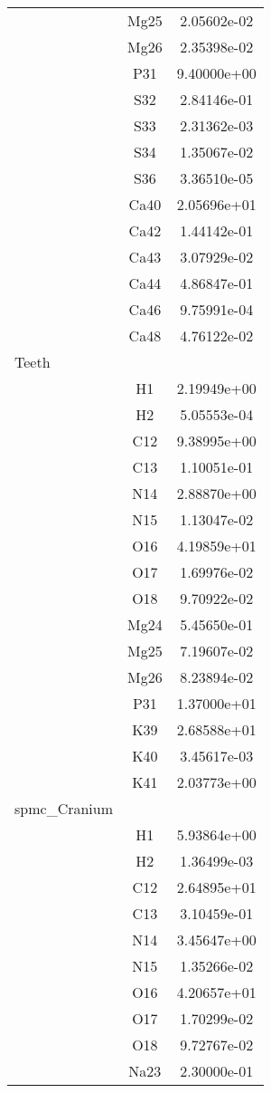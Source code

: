 \begin{centering}
\begin{longtable}{l c c}
& Mg25 & 2.05602e-02 \\ 
& Mg26 & 2.35398e-02 \\ 
& P31 & 9.40000e+00 \\ 
& S32 & 2.84146e-01 \\ 
& S33 & 2.31362e-03 \\ 
& S34 & 1.35067e-02 \\ 
& S36 & 3.36510e-05 \\ 
& Ca40 & 2.05696e+01 \\ 
& Ca42 & 1.44142e-01 \\ 
& Ca43 & 3.07929e-02 \\ 
& Ca44 & 4.86847e-01 \\ 
& Ca46 & 9.75991e-04 \\ 
& Ca48 & 4.76122e-02 \\ 
\hline
Teeth & & \\
\hline
& H1 & 2.19949e+00 \\ 
& H2 & 5.05553e-04 \\ 
& C12 & 9.38995e+00 \\ 
& C13 & 1.10051e-01 \\ 
& N14 & 2.88870e+00 \\ 
& N15 & 1.13047e-02 \\ 
& O16 & 4.19859e+01 \\ 
& O17 & 1.69976e-02 \\ 
& O18 & 9.70922e-02 \\ 
& Mg24 & 5.45650e-01 \\ 
& Mg25 & 7.19607e-02 \\ 
& Mg26 & 8.23894e-02 \\ 
& P31 & 1.37000e+01 \\ 
& K39 & 2.68588e+01 \\ 
& K40 & 3.45617e-03 \\ 
& K41 & 2.03773e+00 \\ 
\hline
spmc_Cranium & & \\
\hline
& H1 & 5.93864e+00 \\ 
& H2 & 1.36499e-03 \\ 
& C12 & 2.64895e+01 \\ 
& C13 & 3.10459e-01 \\ 
& N14 & 3.45647e+00 \\ 
& N15 & 1.35266e-02 \\ 
& O16 & 4.20657e+01 \\ 
& O17 & 1.70299e-02 \\ 
& O18 & 9.72767e-02 \\ 
& Na23 & 2.30000e-01 \\ 

\end{longtable}
\end{centering}

